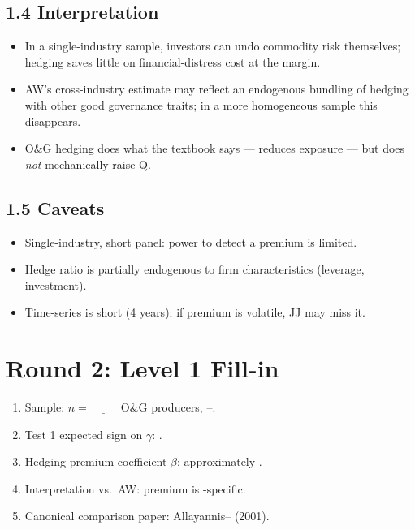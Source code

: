\documentclass[11pt]{article}
\newcommand{\blank}[1]{\underline{\hspace{#1}}}
\begin{document}
\subsection*{1.4 Interpretation}
\begin{itemize}
\item In a single-industry sample, investors can undo commodity risk themselves; hedging saves little on financial-distress cost at the margin.
\item AW's cross-industry estimate may reflect an endogenous bundling of hedging with other good governance traits; in a more homogeneous sample this disappears.
\item O\&G hedging does what the textbook says --- reduces exposure --- but does \emph{not} mechanically raise Q.
\end{itemize}

\subsection*{1.5 Caveats}
\begin{alertbox}
\begin{itemize}
\item Single-industry, short panel: power to detect a premium is limited.
\item Hedge ratio is partially endogenous to firm characteristics (leverage, investment).
\item Time-series is short (4 years); if premium is volatile, JJ may miss it.
\end{itemize}
\end{alertbox}

\section*{Round 2: Level 1 Fill-in}
\begin{enumerate}
\item Sample: $n=\blank{1cm}$ O\&G producers, \blank{1cm}--\blank{1cm}.
\item Test 1 expected sign on $\gamma$: \blank{1cm}.
\item Hedging-premium coefficient $\beta$: approximately \blank{1cm}.
\item Interpretation vs.\ AW: premium is \blank{2cm}-specific.
\item Canonical comparison paper: Allayannis--\blank{1.5cm} (2001).
\end{enumerate}
\end{document}

